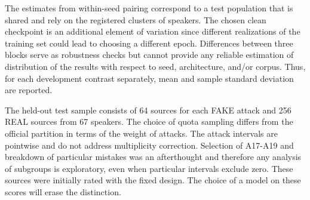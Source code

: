 The estimates from within-seed pairing correspond to a test population that is shared and rely on the registered clusters of speakers. The chosen clean checkpoint is an additional element of variation since different realizations of the training set could lead to choosing a different epoch. Differences between three blocks serve as robustness checks but cannot provide any reliable estimation of distribution of the results with respect to seed, architecture, and/or corpus. Thus, for each development contrast separately, mean and sample standard deviation are reported.

The held-out test sample consists of 64 sources for each FAKE attack and 256 REAL sources from 67 speakers. The choice of quota sampling differs from the official partition in terms of the weight of attacks. The attack intervals are pointwise and do not address multiplicity correction. Selection of A17-A19 and breakdown of particular mistakes was an afterthought and therefore any analysis of subgroups is exploratory, even when particular intervals exclude zero. These sources were initially rated with the fixed design. The choice of a model on these scores will erase the distinction.
